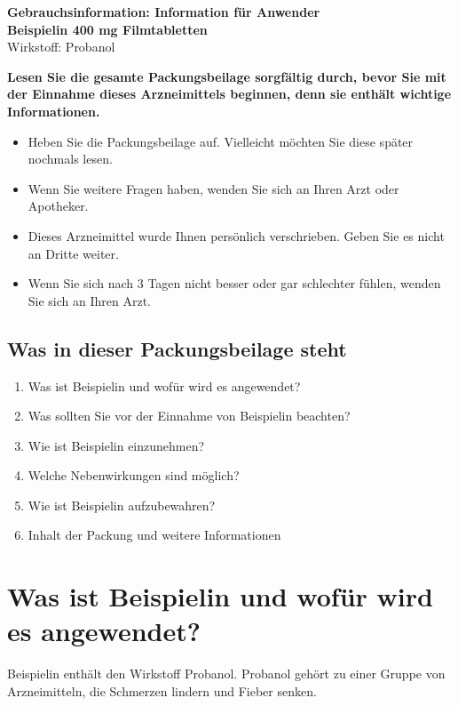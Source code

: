 \documentclass[9.5pt,a4paper]{extarticle}
\newcommand{\wichtig}[1]{\begin{tcolorbox}[colback=pharma!8, colframe=pharma, boxrule=0.6pt, arc=2pt, left=7pt, right=7pt,
  top=4pt, bottom=4pt]#1\end{tcolorbox}}
\begin{document}
{\Large\bfseries Gebrauchsinformation: Information für Anwender}\\[0.3em]
{\fontsize{20}{24}\selectfont\bfseries\color{pharma} Beispielin 400 mg Filmtabletten}\\[0.2em]
{\large Wirkstoff: Probanol}

\vspace{0.2em}
\wichtig{\textbf{Lesen Sie die gesamte Packungsbeilage sorgfältig durch, bevor Sie mit der Einnahme dieses
Arzneimittels beginnen, denn sie enthält wichtige Informationen.}
\begin{itemize}
  \item Heben Sie die Packungsbeilage auf. Vielleicht möchten Sie diese später nochmals lesen.
  \item Wenn Sie weitere Fragen haben, wenden Sie sich an Ihren Arzt oder Apotheker.
  \item Dieses Arzneimittel wurde Ihnen persönlich verschrieben. Geben Sie es nicht an Dritte weiter.
  \item Wenn Sie sich nach 3 Tagen nicht besser oder gar schlechter fühlen, wenden Sie sich an Ihren Arzt.
\end{itemize}}

\subsection*{Was in dieser Packungsbeilage steht}
\begin{enumerate}[label=\arabic*., itemsep=0pt]
  \item Was ist Beispielin und wofür wird es angewendet?
  \item Was sollten Sie vor der Einnahme von Beispielin beachten?
  \item Wie ist Beispielin einzunehmen?
  \item Welche Nebenwirkungen sind möglich?
  \item Wie ist Beispielin aufzubewahren?
  \item Inhalt der Packung und weitere Informationen
\end{enumerate}

\section{Was ist Beispielin und wofür wird es angewendet?}
Beispielin enthält den Wirkstoff Probanol. Probanol gehört zu einer Gruppe von Arzneimitteln, die Schmerzen lindern
und Fieber senken.
\end{document}
